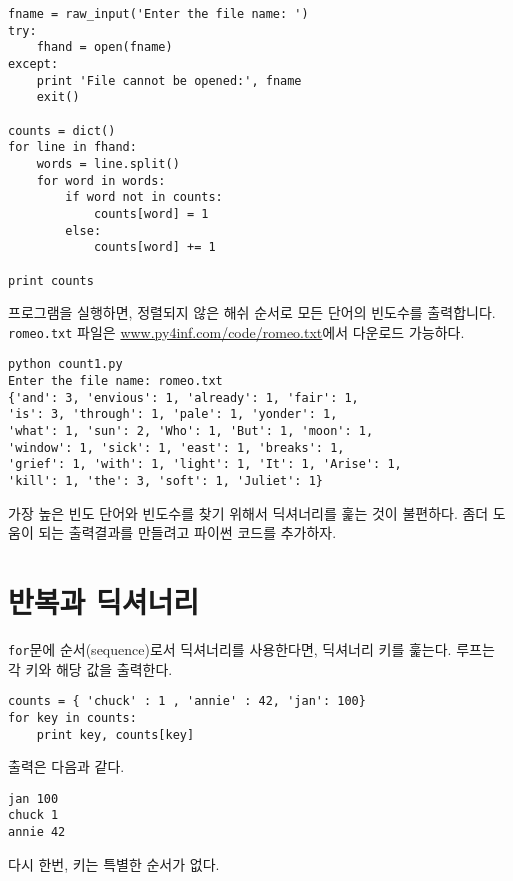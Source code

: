 \beforeverb
\begin{verbatim}
fname = raw_input('Enter the file name: ')
try:
    fhand = open(fname)
except:
    print 'File cannot be opened:', fname
    exit()

counts = dict()
for line in fhand:
    words = line.split()
    for word in words:
        if word not in counts:
            counts[word] = 1
        else:
            counts[word] += 1

print counts
\end{verbatim}
\afterverb
%

프로그램을 실행하면, 정렬되지 않은 해쉬 순서로 모든 단어의 빈도수를 출력합니다.
{\tt romeo.txt} 파일은 \url{www.py4inf.com/code/romeo.txt}에서 다운로드 가능하다.

\beforeverb
\begin{verbatim}
python count1.py 
Enter the file name: romeo.txt
{'and': 3, 'envious': 1, 'already': 1, 'fair': 1, 
'is': 3, 'through': 1, 'pale': 1, 'yonder': 1, 
'what': 1, 'sun': 2, 'Who': 1, 'But': 1, 'moon': 1, 
'window': 1, 'sick': 1, 'east': 1, 'breaks': 1, 
'grief': 1, 'with': 1, 'light': 1, 'It': 1, 'Arise': 1, 
'kill': 1, 'the': 3, 'soft': 1, 'Juliet': 1}
\end{verbatim}
\afterverb
%

가장 높은 빈도 단어와 빈도수를 찾기 위해서 딕셔너리를 훑는 것이 불편하다. 
좀더 도움이 되는 출력결과를 만들려고 파이썬 코드를 추가하자.

\section{반복과 딕셔너리}


{\tt for}문에 순서(sequence)로서 딕셔너리를 사용한다면, 딕셔너리 키를 훑는다. 
루프는 각 키와 해당 값을 출력한다.

\beforeverb
\begin{verbatim}
counts = { 'chuck' : 1 , 'annie' : 42, 'jan': 100}
for key in counts:
    print key, counts[key]
\end{verbatim}
\afterverb
%

출력은 다음과 같다.

\beforeverb
\begin{verbatim}
jan 100
chuck 1
annie 42
\end{verbatim}
\afterverb
%

다시 한번, 키는 특별한 순서가 없다.

